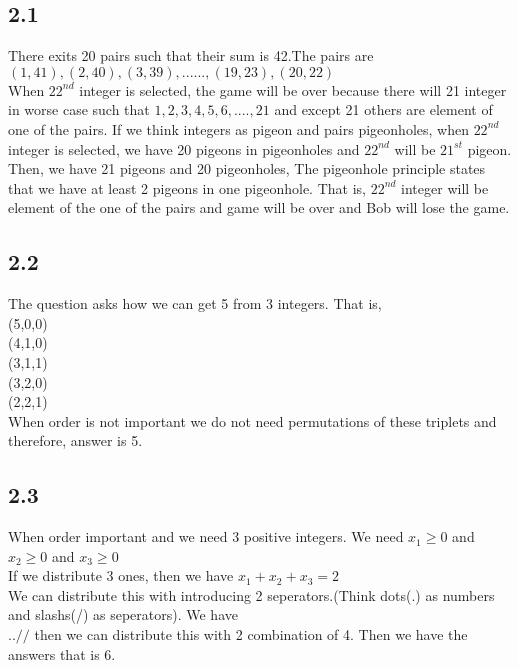 \documentclass[12pt]{article}
\begin{document}
\subsection*{2.1}
There exits 20 pairs such that their sum is 42.The pairs are \\
$(1,41),(2,40),(3,39),......,(19,23), (20,22)$ \\
When $22^{nd}$ integer is selected, the game will be over because there will 21 integer in worse case such that $1,2,3,4,5,6,....,21$ and except 21 others are element of one of the pairs. If we think integers as pigeon and pairs pigeonholes, when $22^{nd}$ integer is selected, we have 20 pigeons in pigeonholes and $22^{nd}$ will be $21^{st}$ pigeon. Then, we have 21 pigeons and 20 pigeonholes, The pigeonhole principle states that we have at least 2 pigeons in one pigeonhole. That is, $22^{nd}$ integer will be element of the one of the pairs and game will be over and Bob will lose the game.
\subsection*{2.2}
The question asks how we can get 5 from 3 integers. That is, \\
(5,0,0) \\
(4,1,0) \\
(3,1,1) \\
(3,2,0) \\
(2,2,1) \\
When order is not important we do not need permutations of these triplets and therefore, answer is 5.
\subsection*{2.3}
When order important and we need 3 positive integers. We need $x_1 \geq 0$ and $x_2 \geq 0$ and $x_3 \geq 0$ \\
If we distribute 3 ones, then we have $x_1+x_2+x_3 = 2$ \\
We can distribute this with introducing 2 seperators.(Think dots(.) as numbers and slashs(/) as seperators). We have \\
$..//$ then we can distribute this with 2 combination of 4. Then we have the answers that is 6.
\end{document}
